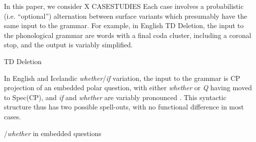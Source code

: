 In this paper, we consider X CASESTUDIES
Each case involves a probabilistic (i.e. ``optional'') alternation between surface variants which presumably have the same input to the grammar.
For example, in English TD Deletion, the input to the phonological grammar are words with a final coda cluster, including a coronal stop, and the output is variably simplified.
\begin{exe}
	\ex TD Deletion\\
\end{exe}

In English and Icelandic {\it whether}/{\it if} variation, the input to the grammar is CP projection of an embedded polar question, with either \textsl{whether} or \textsl{Q} having moved to Spec(CP), and {\it if} and {\it whether} are variably pronounced \citep[following][]{larson1985, hanromero2004}. This syntactic structure thus has two possible spell-outs, with no functional difference in most cases.


\begin{exe}
/{\it whether} in embedded questions\\
\end{exe}



